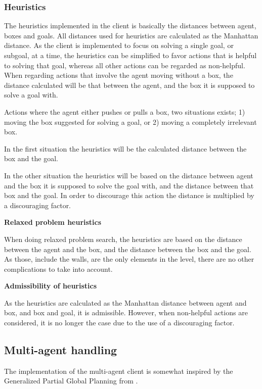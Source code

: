 \documentclass[Main]{subfiles}
\begin{document}
\subsubsection{Heuristics}
\label{sec:method_heuristics}
The heuristics implemented in the client is basically the distances between agent, boxes and goals. All distances used for heuristics are calculated as the Manhattan distance.  As the client is implemented to focus on solving a single goal, or subgoal, at a time, the heuristics can be simplified to favor actions that is helpful to solving that goal, whereas all other actions can be regarded as non-helpful. 
When regarding actions that involve the agent moving without a box, the distance calculated will be that between the agent, and the box it is supposed to solve a goal with. 

Actions where the agent either pushes or pulls a box, two situations exists; 1) moving the box suggested for solving a goal, or 2) moving a completely irrelevant box. 

In the first situation the heuristics will be the calculated distance between the box and the goal.

In the other situation the heuristics will be based on the distance between agent and the box it is supposed to solve the goal with, and the distance between that box and the goal. In order to discourage this action the distance is multiplied by a discouraging factor.


\textbf{Relaxed problem heuristics}

When doing relaxed problem search, the heuristics are based on the distance between the agent and the box, and the distance between the box and the goal. As those, include the walls, are the only elements in the level, there are no other complications to take into account. 


\textbf{Admissibility of heuristics}

As the heuristics are calculated as the Manhattan distance between agent and box, and box and goal, it is admissible. However, when non-helpful actions are considered, it is no longer the case due to the use of a discouraging factor. 



\subsection{Multi-agent handling} 

The implementation of the multi-agent client is somewhat inspired by the Generalized Partial Global Planning from \cite{Decker2000}. 
\end{document}
